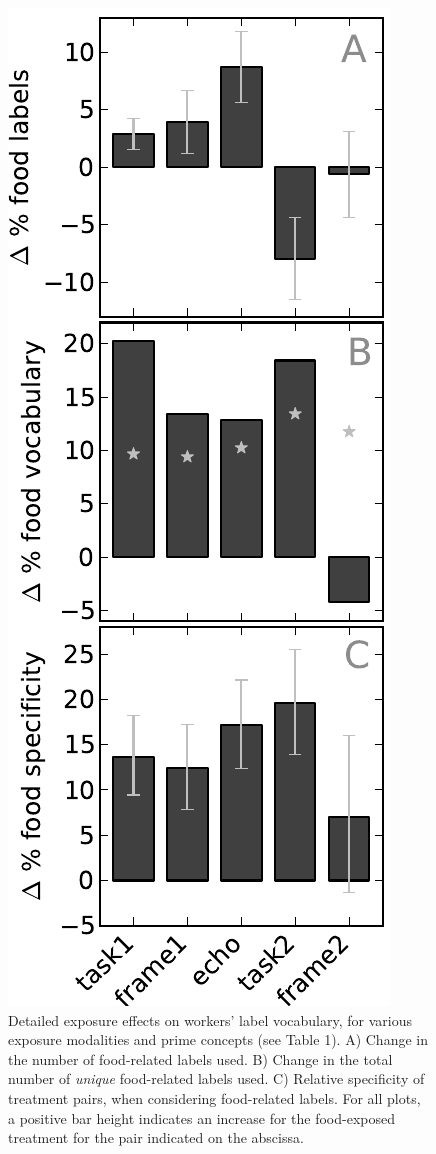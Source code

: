 \documentclass[12pt]{article}
\begin{document}
\begin{figure}
	\centering
	\includegraphics[scale=1]{figs/vocab_specificity.pdf}
	\caption{
		Detailed exposure effects on workers' label vocabulary, for various
		exposure modalities and prime concepts (see Table 1).  A) Change in 
		the number of food-related labels used. B) Change in the total number 
		of \textit{unique} food-related labels used. C) Relative specificity
		of treatment pairs, when considering food-related labels.  For all
		plots, a positive bar height indicates an increase for the 
		food-exposed treatment for the pair indicated on the abscissa.
	}
	\label{fig:specificity}
\end{figure}
\end{document}
